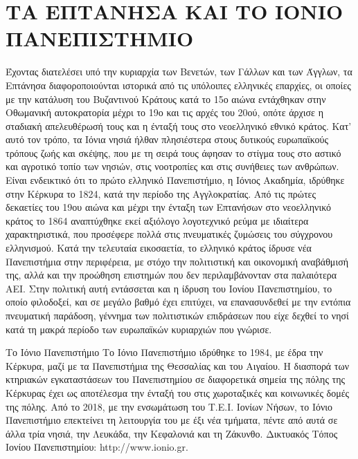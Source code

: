 \hypertarget{ux3c4ux3b1-ux3b5ux3c0ux3c4ux3b1ux3bdux3b7ux3c3ux3b1-ux3baux3b1ux3b9-ux3c4ux3bf-ux3b9ux3bfux3bdux3b9ux3bf-ux3c0ux3b1ux3bdux3b5ux3c0ux3b9ux3c3ux3c4ux3b7ux3bcux3b9ux3bf}{%
\chapter{ΤΑ ΕΠΤΑΝΗΣΑ ΚΑΙ ΤΟ ΙΟΝΙΟ
ΠΑΝΕΠΙΣΤΗΜΙΟ}\label{ux3c4ux3b1-ux3b5ux3c0ux3c4ux3b1ux3bdux3b7ux3c3ux3b1-ux3baux3b1ux3b9-ux3c4ux3bf-ux3b9ux3bfux3bdux3b9ux3bf-ux3c0ux3b1ux3bdux3b5ux3c0ux3b9ux3c3ux3c4ux3b7ux3bcux3b9ux3bf}}

Έχοντας διατελέσει υπό την κυριαρχία των Βενετών, των Γάλλων και των
Άγγλων, τα Επτάνησα διαφοροποιούνται ιστορικά από τις υπόλοιπες
ελληνικές επαρχίες, οι οποίες με την κατάλυση του Βυζαντινού Κράτους
κατά το 15ο αιώνα εντάχθηκαν στην Οθωμανική αυτοκρατορία μέχρι το 19ο
και τις αρχές του 20ού, οπότε άρχισε η σταδιακή απελευθέρωσή τους και η
ένταξή τους στο νεοελληνικό εθνικό κράτος. Κατ' αυτό τον τρόπο, τα Ιόνια
νησιά ήλθαν πλησιέστερα στους δυτικούς ευρωπαϊκούς τρόπους ζωής και
σκέψης, που με τη σειρά τους άφησαν το στίγμα τους στο αστικό και
αγροτικό τοπίο των νησιών, στις νοοτροπίες και στις συνήθειες των
ανθρώπων. Είναι ενδεικτικό ότι το πρώτο ελληνικό Πανεπιστήμιο, η Ιόνιος
Ακαδημία, ιδρύθηκε στην Κέρκυρα το 1824, κατά την περίοδο της
Αγγλοκρατίας. Από τις πρώτες δεκαετίες του 19ου αιώνα και μέχρι την
ένταξη των Επτανήσων στο νεοελληνικό κράτος το 1864 αναπτύχθηκε εκεί
αξιόλογο λογοτεχνικό ρεύμα με ιδιαίτερα χαρακτηριστικά, που προσέφερε
πολλά στις πνευματικές ζυμώσεις του σύγχρονου ελληνισμού. Κατά την
τελευταία εικοσαετία, το ελληνικό κράτος ίδρυσε νέα Πανεπιστήμια στην
περιφέρεια, με στόχο την πολιτιστική και οικονομική αναβάθμισή της, αλλά
και την προώθηση επιστημών που δεν περιλαμβάνονταν στα παλαιότερα ΑΕΙ.
Στην πολιτική αυτή εντάσσεται και η ίδρυση του Ιονίου Πανεπιστημίου, το
οποίο φιλοδοξεί, και σε μεγάλο βαθμό έχει επιτύχει, να επανασυνδεθεί με
την εντόπια πνευματική παράδοση, γέννημα των πολιτιστικών επιδράσεων που
είχε δεχθεί το νησί κατά τη μακρά περίοδο των ευρωπαϊκών κυριαρχιών που
γνώρισε.

Το Ιόνιο Πανεπιστήμιο Το Ιόνιο Πανεπιστήμιο ιδρύθηκε το 1984, με έδρα
την Κέρκυρα, μαζί με τα Πανεπιστήμια της Θεσσαλίας και του Αιγαίου. H
διασπορά των κτηριακών εγκαταστάσεων του Πανεπιστημίου σε διαφορετικά
σημεία της πόλης της Κέρκυρας έχει ως αποτέλεσμα την ένταξή του στις
χωροταξικές και κοινωνικές δομές της πόλης. Από το 2018, με την
ενσωμάτωση του Τ.Ε.Ι. Ιονίων Νήσων, το Ιόνιο Πανεπιστήμιο επεκτείνει τη
λειτουργία του με έξι νέα τμήματα, πέντε από αυτά σε άλλα τρία νησιά,
την Λευκάδα, την Κεφαλονιά και τη Ζάκυνθο. Δικτυακός Τόπος Ιονίου
Πανεπιστημίου: http://www.ionio.gr.

